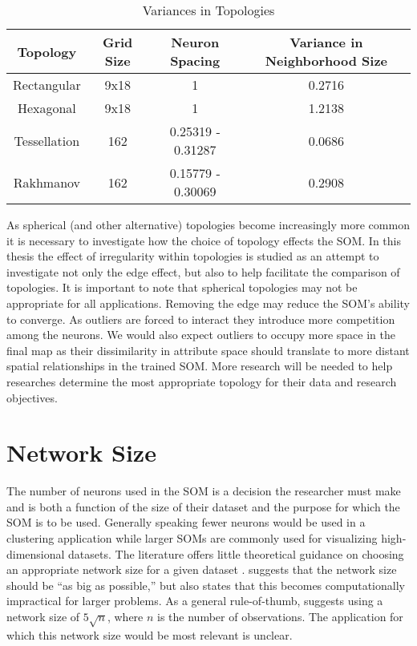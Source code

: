 \begin{table}[htbp]
\caption{Variances in Topologies}
\begin{center}
\begin{tabular}{|c|c|c|c|}
\hline
Topology&Grid Size&Neuron Spacing&Variance in Neighborhood Size\\
\hline
Rectangular&9x18&1&0.2716\\
Hexagonal&9x18&1&1.2138\\
Tessellation&162&0.25319 - 0.31287& 0.0686\\
Rakhmanov&162&0.15779 - 0.30069& 0.2908\\
\hline
\end{tabular}
\end{center}
\label{table1}
\end{table}

As spherical (and other alternative) topologies become
increasingly more common it is necessary to investigate how the choice of
topology effects the SOM.  In this thesis the effect of irregularity within
topologies is studied as an attempt to investigate not only the edge effect,
but also to help facilitate the comparison of topologies.  It is important to
note that spherical topologies may not be appropriate for all applications.
Removing the edge may reduce the SOM's ability to converge.  As outliers are
forced to interact they introduce more competition among the neurons.  We
would also expect outliers to occupy more space in the final map as their
dissimilarity in attribute space should translate to more distant spatial
relationships in the trained SOM.  More research will be needed to help researches
determine the most appropriate topology for their data and research objectives.

\section{Network Size}
\label{bg:size}
The number of neurons used in the SOM is a decision the researcher must make and
is both a function of the size of their dataset and the purpose for which the
SOM is to be used.  Generally speaking fewer neurons would be used in a
clustering application while larger SOMs are commonly used for visualizing
high-dimensional datasets.  The literature offers little theoretical guidance
on choosing an appropriate network size for a given dataset \citep{cho1996}.
\cite{toolbox} suggests that the network size should be ``as big as
possible,'' but also states that this becomes computationally impractical for
larger problems. As a general rule-of-thumb, \citeauthor{toolbox} suggests using a
network size of \(5\sqrt {n}\), where \(n\) is the number of observations. The
application for which this network size would be most relevant is unclear.  

